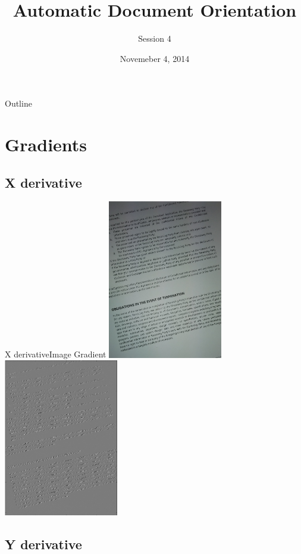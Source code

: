 \documentclass{beamer}
\title{Automatic Document Orientation}
\subtitle{Session 4}
\institute[Computer Vision Group]
{
  Computer Vision Group\\
  IIT Madras
}
\date{Novemeber 4, 2014}
\begin{document}
\begin{frame}
  \titlepage
\end{frame}

\begin{frame}{Outline}
  \tableofcontents
\end{frame}

\section{Gradients}
\subsection{X derivative}

\begin{frame}{X derivative}{Image Gradient}
\centering    
    \includegraphics[width=50mm]{./Image1.jpg}\includegraphics[width=50mm]{./sobelx.png}

\end{frame}

\subsection{Y derivative}
\end{document}
